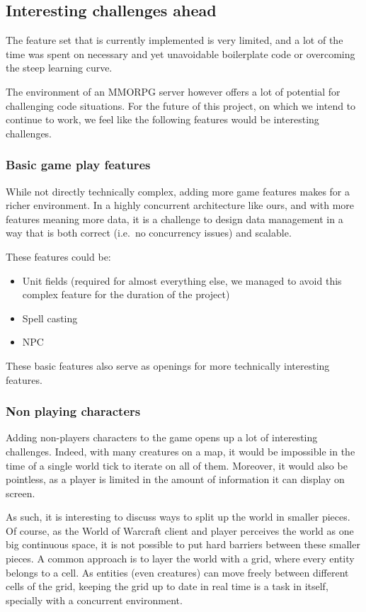 \documentclass[paper=a4, fontsize=11pt]{scrartcl}
\begin{document}
\subsection{Interesting challenges ahead}

The feature set that is currently implemented is very limited, and a lot of the
time was spent on necessary and yet unavoidable boilerplate code or overcoming
the steep learning curve.

The environment of an MMORPG server however offers a lot of potential for
challenging code situations.
For the future of this project, on which we intend to continue to work, we
feel like the following features would be interesting challenges.

\subsubsection{Basic game play features}

While not directly technically complex, adding more game features makes for a
richer environment. In a highly concurrent architecture like ours, and with more
features meaning more data, it is a challenge to design data management in a way
that is both correct (i.e.\ no concurrency issues) and scalable.

These features could be:
\begin{itemize}
    \item Unit fields (required for almost everything else, we managed to avoid
        this complex feature for the duration of the project)
    \item Spell casting
    \item \gls{NPC}
\end{itemize}

These basic features also serve as openings for more technically interesting
features.

\subsubsection{Non playing characters}

Adding non-players characters to the game opens up a lot of interesting
challenges.
Indeed, with many creatures on a map, it would be impossible in the time of a
single world tick to iterate on all of them.
Moreover, it would also be pointless, as a player is limited in the amount of
information it can display on screen.

As such, it is interesting to discuss ways to split up the world in smaller
pieces.
Of course, as the World of Warcraft client and player perceives the world
as one big continuous space, it is not possible to put hard barriers between
these smaller pieces.
A common approach is to layer the world with a grid, where every entity belongs
to a cell. As entities (even creatures) can move freely between different cells 
of the grid, keeping the grid up to date in real time is a task in itself,
specially with a concurrent environment.
\end{document}
